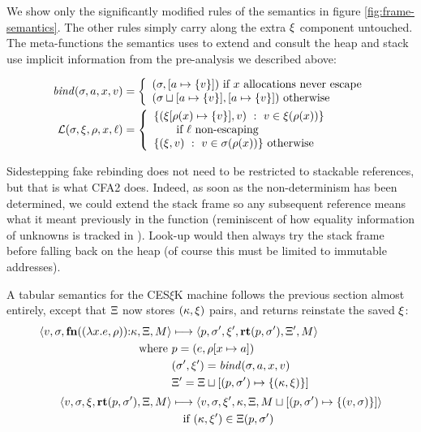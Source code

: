 We show only the significantly modified rules of the semantics in figure \ref{fig:frame-semantics}.
%
The other rules simply carry along the extra $\xi$ component untouched.
%
The meta-functions the semantics uses to extend and consult the heap and stack use implicit information from the pre-analysis we described above:

\begin{align*}
  \mathit{bind}(\sigma,a,x,v) &=
   \left\{\begin{array}{l}
            (\sigma, [a \mapsto \{ v \}]) \text{ if } x \text{ allocations never escape} \\
            (\sigma\sqcup[a \mapsto \{ v \}], [a \mapsto \{ v \}]) \text{ otherwise} \\
          \end{array}\right. \\
  {\mathcal L}(\sigma,\xi,\rho,x,\ell) &=
    \left\{\begin{array}{l}
          \{ (\xi[\rho(x) \mapsto \{ v \}], v)\ :\ v \in \xi(\rho(x))\}
                   \\ \qquad \text{if } \ell \text{ non-escaping} \\
          \{ (\xi,v)\ :\ v \in \sigma(\rho(x))\} \text{ otherwise}
           \end{array}\right.
\end{align*}

Sidestepping fake rebinding does not need to be restricted to stackable references, but that is what CFA2 does.
%
Indeed, as soon as the non-determinism has been determined, we could extend the stack frame so any subsequent reference means what it meant previously in the function (reminiscent of how equality information of unknowns is tracked in \citet{ianjohnson:DBLP:journals/cacm/DilligDA10}).
%
Look-up would then always try the stack frame before falling back on the heap (of course this must be limited to immutable addresses).

A tabular semantics for the CES$\xi$K machine follows the previous section almost entirely, except that $\Xi$ now stores $(\kappa, \xi)$ pairs, and returns reinstate the saved $\xi$:
\begin{align*}
  \langle v,\sigma,\mathbf{fn}{}((\lambda{} x. e, \rho)){\tt :} \kappa,\Xi,M \rangle &\longmapsto
  \langle p,
    \sigma',
    \xi',
    \mathbf{rt}(p, \sigma'),
    \Xi',
    M \rangle \\
  \text{where }
  & p = (e, \rho[x \mapsto a]) \\
  & (\sigma',\xi') = \mathit{bind}(\sigma,a,x,v) \\
  & \Xi' = \Xi\sqcup[(p, \sigma') \mapsto \{ (\kappa,\xi) \}]
\\[2pt]
 \langle v, \sigma, \xi, \mathbf{rt}(p,\sigma'), \Xi, M \rangle &\longmapsto
 \langle v, \sigma, \xi', \kappa, \Xi, M\sqcup[(p, \sigma') \mapsto \{ (v,\sigma) \}] \rangle
  \\ & \quad\text{if } (\kappa,\xi') \in \Xi(p, \sigma')
\end{align*}


